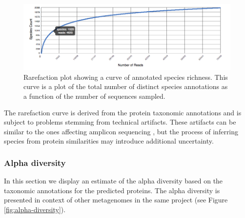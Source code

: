 \documentclass[12pt,fullpage]{report}
\begin{document}

\begin{figure}
\begin{center}
\includegraphics[width=6in]{Images/rarefaction.png}
\end{center}
\caption{
Rarefaction plot showing a curve of annotated species richness. This curve is a plot of the total number of distinct species annotations as a function of the number of sequences sampled.
}
\label{fig:rarefaction}
\end{figure}

The rarefaction curve is derived from the protein taxonomic annotations and is subject to problems stemming from technical artifacts. These artifacts can be similar to the ones affecting amplicon sequencing \cite{RARE}, but the process of inferring species from protein similarities may introduce additional uncertainty.


\subsubsection{Alpha diversity}
In this section we display an estimate of the alpha diversity based on the taxonomic annotations for the predicted proteins. The alpha diversity is presented in context of other metagenomes in the same project (see Figure \ref{fig:alpha-diversity}).
\end{document}
